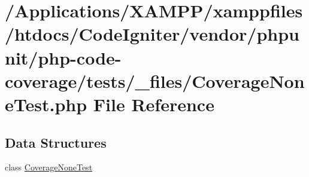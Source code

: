 \hypertarget{php-code-coverage_2tests_2__files_2_coverage_none_test_8php}{}\section{/\+Applications/\+X\+A\+M\+P\+P/xamppfiles/htdocs/\+Code\+Igniter/vendor/phpunit/php-\/code-\/coverage/tests/\+\_\+files/\+Coverage\+None\+Test.php File Reference}
\label{php-code-coverage_2tests_2__files_2_coverage_none_test_8php}
\subsection*{Data Structures}
\begin{DoxyCompactItemize}
\item 
class \mbox{\hyperlink{class_coverage_none_test}{Coverage\+None\+Test}}
\end{DoxyCompactItemize}

